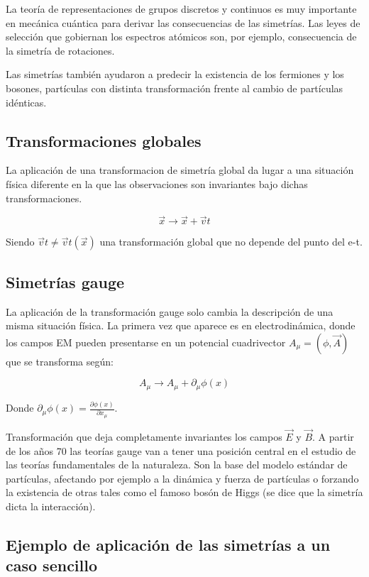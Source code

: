 La teoría de representaciones de grupos discretos y continuos es muy importante en mecánica cuántica para derivar las consecuencias de las simetrías. Las leyes de selección que gobiernan los espectros atómicos son, por ejemplo, consecuencia de la simetría de rotaciones.

Las simetrías también ayudaron a predecir la existencia de los fermiones y los bosones, partículas con distinta transformación frente al cambio de partículas idénticas.

\subsection{Transformaciones globales}
La aplicación de una transformacion de simetría global da lugar a una situación física diferente en la que las observaciones son invariantes bajo dichas transformaciones.

$$\Vec{x}\longrightarrow \Vec{x}+\Vec{v}t$$

Siendo $\Vec{v}t\neq \Vec{v}t(\Vec{x})$ una transformación global que no depende del punto del e-t.


\subsection{Simetrías gauge}
La aplicación de la transformación gauge solo cambia la descripción de una misma situación física. La primera vez que aparece es en electrodinámica, donde los campos EM pueden presentarse en un potencial cuadrivector $A_\mu=(\phi, \Vec{A})$ que se transforma según:

$$A_\mu \longrightarrow A_\mu +\partial _\mu \phi (x)$$

Donde $\partial _\mu \phi (x)=\frac{\partial \phi (x)}{\partial x_\mu}$.

Transformación que deja completamente invariantes los campos $\Vec{E}$ y $\Vec{B}$. A partir de los años 70 las teorías gauge van a tener una posición central en el estudio de las teorías fundamentales de la naturaleza. Son la base del modelo estándar de partículas, afectando por ejemplo a la dinámica y fuerza de partículas o forzando la existencia de otras tales como el famoso bosón de Higgs (se dice que la simetría dicta la interacción).

\newpage
\subsection{Ejemplo de aplicación de las simetrías a un caso sencillo}

